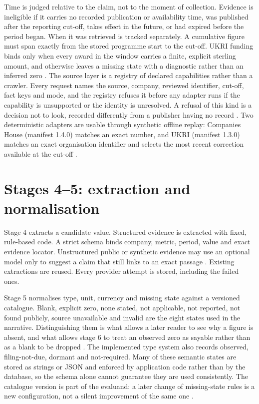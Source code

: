 Time is judged relative to the claim, not to the moment of collection. Evidence is ineligible if it
carries no recorded publication or availability time, was published after the reporting cut-off,
takes effect in the future, or had expired before the period began. When it was retrieved is tracked
separately. A cumulative figure must span exactly from the stored programme start to the cut-off.
UKRI funding binds only when every award in the window carries a finite, explicit sterling amount,
and otherwise leaves a missing state with a diagnostic rather than an inferred zero
\citep{hardman2023small,kapoor2023leakage,nikiforova2020quality}. The source layer is a registry of
declared capabilities rather than a crawler. Every request names the source, company, reviewed
identifier, cut-off, fact keys and mode, and the registry refuses it before any adapter runs if the
capability is unsupported or the identity is unresolved. A refusal of this kind is a decision not to
look, recorded differently from a publisher having no record
\citep{gebru2021datasheets,pineau2021reproducibility}. Two deterministic adapters are usable through
synthetic offline replay: Companies House (manifest 1.4.0) matches an exact number, and UKRI
(manifest 1.3.0) matches an exact organisation identifier and selects the most recent correction
available at the cut-off \citep{galanakis2026chrt,hardman2023small}.

\section{Stages 4--5: extraction and normalisation}

Stage 4 extracts a candidate value. Structured evidence is extracted with fixed, rule-based code. A
strict schema binds company, metric, period, value and exact evidence locator. Unstructured public or
synthetic evidence may use an optional model only to suggest a claim that still links to an exact
passage \citep{gao2023alce,gao2023rarr}. Existing extractions are reused. Every provider attempt is
stored, including the failed ones.

Stage 5 normalises type, unit, currency and missing state against a versioned catalogue. Blank,
explicit zero, none stated, not applicable, not reported, not found publicly, source unavailable and
invalid are the eight states used in the narrative. Distinguishing them is what allows a later
reader to see why a figure is absent, and what allows stage 6 to treat an observed zero as sayable
rather than as a blank to be dropped
\citep{nikiforova2020quality,gebru2021datasheets,bradley2024synfintabs}. The implemented type
system also records observed, filing-not-due, dormant and not-required. Many of these semantic
states are stored as strings or JSON and enforced by application code rather than by the
database, so the schema alone cannot guarantee they are used consistently. The catalogue version
is part of the evaluand: a later change of missing-state rules is a new configuration, not a
silent improvement of the same one \citep{pineau2021reproducibility,mitchell2019modelcards}.

